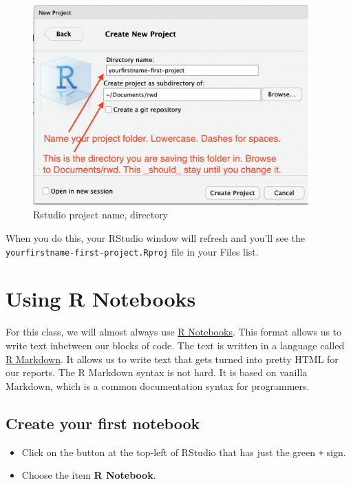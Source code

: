 \documentclass[]{book}
\providecommand{\tightlist}{%
  \setlength{\itemsep}{0pt}\setlength{\parskip}{0pt}}
\begin{document}
\begin{figure}
\centering
\includegraphics[width=4.16667in]{images/intro-newproject.png}
\caption{Rstudio project name, directory}
\end{figure}

When you do this, your RStudio window will refresh and you'll see the
\texttt{yourfirstname-first-project.Rproj} file in your Files list.

\section{Using R Notebooks}\label{using-r-notebooks}

For this class, we will almost always use
\href{https://rmarkdown.rstudio.com/lesson-10.html}{R Notebooks}. This
format allows us to write text inbetween our blocks of code. The text is
written in a language called
\href{https://rmarkdown.rstudio.com/lesson-1.html}{R Markdown}. It
allows us to write text that gets turned into pretty HTML for our
reports. The R Markdown syntax is not hard. It is based on vanilla
Markdown, which is a common documentation syntax for programmers.

\subsection{Create your first
notebook}\label{create-your-first-notebook}

\begin{itemize}
\tightlist
\item
  Click on the button at the top-left of RStudio that has just the green
  \texttt{+} sign.
\item
  Choose the item \textbf{R Notebook}.
\end{itemize}
\end{document}
